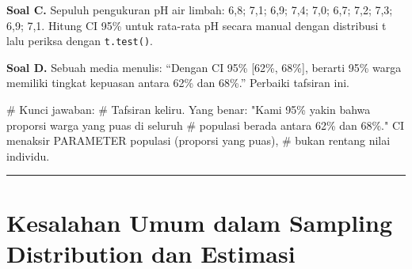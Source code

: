 \documentclass[
  indonesian,
  letterpaper,
]{book}
\newenvironment{Shaded}{\begin{snugshade}}{\end{snugshade}}
\newcommand{\CommentTok}[1]{\textcolor[rgb]{0.37,0.37,0.37}{#1}}
\newcommand{\DecValTok}[1]{\textcolor[rgb]{0.68,0.00,0.00}{#1}}
\newcommand{\FloatTok}[1]{\textcolor[rgb]{0.68,0.00,0.00}{#1}}
\newcommand{\FunctionTok}[1]{\textcolor[rgb]{0.28,0.35,0.67}{#1}}
\newcommand{\NormalTok}[1]{\textcolor[rgb]{0.00,0.23,0.31}{#1}}
\newcommand{\OtherTok}[1]{\textcolor[rgb]{0.00,0.23,0.31}{#1}}
\newcommand{\SpecialCharTok}[1]{\textcolor[rgb]{0.37,0.37,0.37}{#1}}
\begin{document}
\textbf{Soal C.} Sepuluh pengukuran pH air limbah: 6,8; 7,1; 6,9; 7,4;
7,0; 6,7; 7,2; 7,3; 6,9; 7,1. Hitung CI 95\% untuk rata-rata pH secara
manual dengan distribusi t lalu periksa dengan \texttt{t.test()}.

\begin{Shaded}
\end{Shaded}

\textbf{Soal D.} Sebuah media menulis: ``Dengan CI 95\% {[}62\%,
68\%{]}, berarti 95\% warga memiliki tingkat kepuasan antara 62\% dan
68\%.'' Perbaiki tafsiran ini.

\begin{Shaded}
\begin{Highlighting}[]
\CommentTok{\# Kunci jawaban:}
\CommentTok{\# Tafsiran keliru. Yang benar: "Kami 95\% yakin bahwa proporsi warga yang puas di seluruh}
\CommentTok{\# populasi berada antara 62\% dan 68\%." CI menaksir PARAMETER populasi (proporsi yang puas),}
\CommentTok{\# bukan rentang nilai individu.}
\end{Highlighting}
\end{Shaded}

\begin{center}\rule{0.5\linewidth}{0.5pt}\end{center}


\chapter{Kesalahan Umum dalam Sampling Distribution dan
Estimasi}\label{kesalahan-umum-dalam-sampling-distribution-dan-estimasi}
\end{document}
